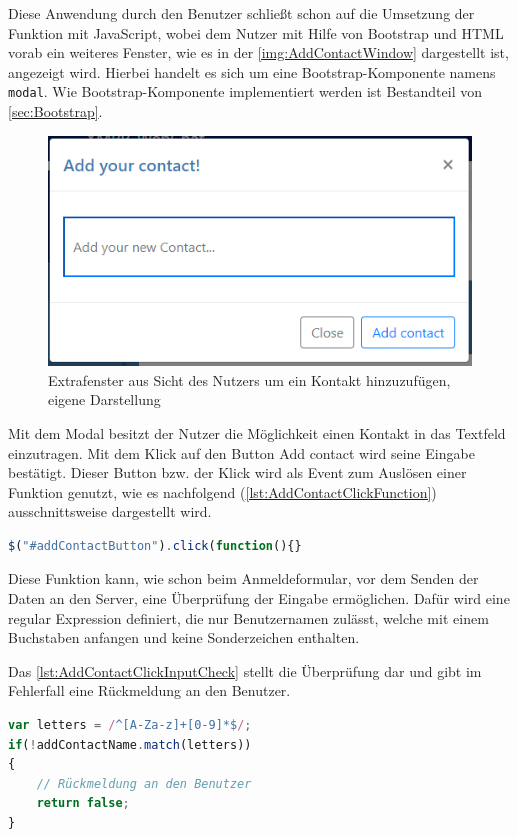 \documentclass[a4paper,titlepage,halfparskip,12pt]{scrreprt}
\begin{document}
\begin{onehalfspacing}
Diese Anwendung durch den Benutzer schließt schon auf die Umsetzung der Funktion mit JavaScript, wobei dem Nutzer mit Hilfe von Bootstrap und \ac{HTML} vorab ein weiteres Fenster, wie es in der \autoref{img:AddContactWindow} dargestellt ist, angezeigt wird. Hierbei handelt es sich um eine Bootstrap-Komponente namens \texttt{modal}. Wie Bootstrap-Komponente implementiert werden ist Bestandteil von \autoref{sec:Bootstrap}. 
\begin{figure}[h]
	\centering
	\includegraphics[scale=1.0]{images/AddContactWindow}
	\caption{Extrafenster aus Sicht des Nutzers um ein Kontakt hinzuzufügen, eigene Darstellung}
	\label{img:AddContactWindow}
\end{figure}
Mit dem Modal besitzt der Nutzer die Möglichkeit einen Kontakt in das Textfeld einzutragen. Mit dem Klick auf den Button \glqq Add contact\grqq{} wird seine Eingabe bestätigt. Dieser Button bzw. der Klick wird als Event zum Auslösen einer Funktion genutzt, wie es nachfolgend (\autoref{lst:AddContactClickFunction}) ausschnittsweise dargestellt wird.
\begin{lstlisting}[language=Javascript,caption=Funktionsverknüpfung an den Kontak hinzufügen Button unter JS,label={lst:AddContactClickFunction}]
$("#addContactButton").click(function(){}
\end{lstlisting}
Diese Funktion kann, wie schon beim Anmeldeformular, vor dem Senden der Daten an den Server, eine Überprüfung der Eingabe ermöglichen. Dafür wird eine regular Expression definiert, die nur Benutzernamen zulässt, welche mit einem Buchstaben anfangen und keine Sonderzeichen enthalten.

Das \autoref{lst:AddContactClickInputCheck} stellt die Überprüfung dar und gibt im Fehlerfall eine Rückmeldung an den Benutzer.
\begin{lstlisting}[language=Javascript,caption=Überprüfung der Eingabe mittels eines regulären Ausdrucks,label={lst:AddContactClickInputCheck}]
var letters = /^[A-Za-z]+[0-9]*$/;
if(!addContactName.match(letters))
{
	// Rückmeldung an den Benutzer
	return false;
}
\end{lstlisting}


\end{onehalfspacing}
\end{document}
